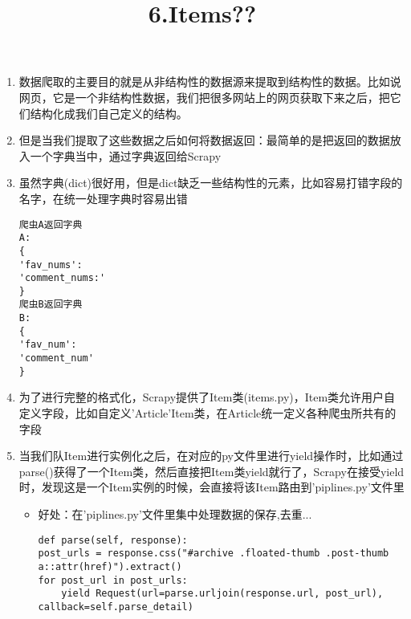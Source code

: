 \documentclass[11pt]{article}
\title{6.Items??}
\begin{document}
    
    
    \maketitle
    
    

    
    \begin{enumerate}
\def\labelenumi{\arabic{enumi}.}
\item
  数据爬取的主要目的就是从非结构性的数据源来提取到结构性的数据。比如说网页，它是一个非结构性数据，我们把很多网站上的网页获取下来之后，把它们结构化成我们自己定义的结构。
\item
  但是当我们提取了这些数据之后如何将数据返回：最简单的是把返回的数据放入一个字典当中，通过字典返回给Scrapy
\item
  虽然字典(dict)很好用，但是dict缺乏一些结构性的元素，比如容易打错字段的名字，在统一处理字典时容易出错

\begin{verbatim}
爬虫A返回字典
A:
{
'fav_nums':
'comment_nums:'
}
爬虫B返回字典
B:
{
'fav_num':
'comment_num'
}
\end{verbatim}
\item
  为了进行完整的格式化，Scrapy提供了Item类(items.py)，Item类允许用户自定义字段，比如自定义'Article'Item类，在Article统一定义各种爬虫所共有的字段
\item
  当我们队Item进行实例化之后，在对应的py文件里进行yield操作时，比如通过parse()获得了一个Item类，然后直接把Item类yield就行了，Scrapy在接受yield时，发现这是一个Item实例的时候，会直接将该Item路由到'piplines.py'文件里

  \begin{itemize}
  \item
    好处：在'piplines.py'文件里集中处理数据的保存,去重...

\begin{verbatim}
def parse(self, response):  
post_urls = response.css("#archive .floated-thumb .post-thumb a::attr(href)").extract()
for post_url in post_urls:
    yield Request(url=parse.urljoin(response.url, post_url), callback=self.parse_detail)
\end{verbatim}
  \end{itemize}
\end{enumerate}
\end{document}
